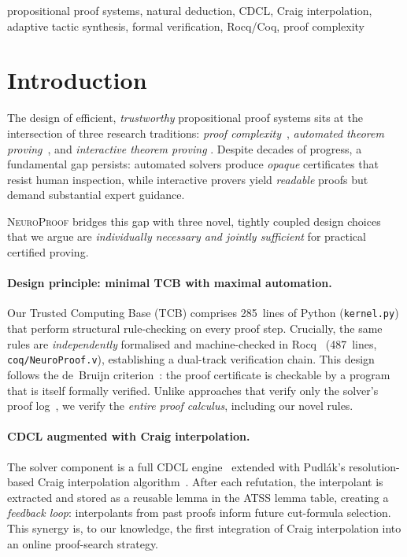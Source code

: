 \documentclass[conference]{IEEEtran}
\newcommand{\NP}{\textsc{NeuroProof}}
\newcommand{\TCB}{\textnormal{TCB}}
\begin{document}
\begin{IEEEkeywords}
propositional proof systems, natural deduction, CDCL, Craig interpolation,
adaptive tactic synthesis, formal verification, Rocq/Coq, proof complexity
\end{IEEEkeywords}

\section{Introduction}
\label{sec:intro}

The design of efficient, \emph{trustworthy} propositional proof systems
sits at the intersection of three research traditions:
\emph{proof complexity}~\cite{CookReckhow1979,Ben-Sasson2001},
\emph{automated theorem proving}~\cite{Davis1962,Robinson1965}, and
\emph{interactive theorem proving}
\cite{CoqDevelopmentTeam2024,MouraKong2021}.
Despite decades of progress, a fundamental gap persists: automated
solvers produce \emph{opaque} certificates that resist human inspection,
while interactive provers yield \emph{readable} proofs but demand
substantial expert guidance.

\NP{} bridges this gap with three novel, tightly coupled design choices
that we argue are \emph{individually necessary and jointly sufficient}
for practical certified proving.

\paragraph{Design principle: minimal \TCB{} with maximal automation.}
Our Trusted Computing Base (\TCB{}) comprises 285~lines of Python
(\texttt{kernel.py}) that perform structural rule-checking on every
proof step.  Crucially, the same rules are \emph{independently}
formalised and machine-checked in Rocq~\cite{CoqDevelopmentTeam2024}
(487~lines, \texttt{coq/NeuroProof.v}), establishing a dual-track
verification chain.  This design follows the de~Bruijn
criterion~\cite{Harrison2009}: the proof certificate is checkable by
a program that is itself formally verified.  Unlike approaches that
verify only the solver's proof log~\cite{HeuleHuntMahmoud2017}, we
verify the \emph{entire proof calculus}, including our novel rules.

\paragraph{CDCL augmented with Craig interpolation.}
The solver component is a full CDCL
engine~\cite{Marques-Silva1999,EenSorensson2003} extended with
Pudl\'{a}k's resolution-based Craig interpolation
algorithm~\cite{Krajicek1995}.  After each refutation, the interpolant
is extracted and stored as a reusable lemma in the ATSS lemma table,
creating a \emph{feedback loop}: interpolants from past proofs inform
future cut-formula selection.  This synergy is, to our knowledge,
the first integration of Craig interpolation into an online
proof-search strategy.
\end{document}
